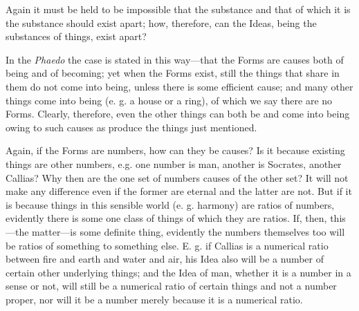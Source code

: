 Again it must be held to be impossible that the substance and that of which it is the substance should exist apart; how, therefore, can the Ideas, being the substances of things, exist apart?

In the \emph{Phaedo} the case is stated in this way—that the Forms are causes both of being and of becoming; yet when the Forms exist, still the things that share in them do not come into being, unless there is some efficient cause; and many other things come into being (e. g. a house or a ring), of which we say there are no Forms. Clearly, therefore, even the other things can both be and come into being owing to such causes as produce the things just mentioned.

Again, if the Forms are numbers, how can they be causes? Is it because existing things are other numbers, e.g. one number is man, another is Socrates, another Callias? Why then are the one set of numbers causes of the other set? It will not make any difference even if the former are eternal and the latter are not. But if it is because things in this sensible world (e. g. harmony) are ratios of numbers, evidently there is some one class of things of which they are ratios. If, then, this—the matter—is some definite thing, evidently the numbers themselves too will be ratios of something to something else. E. g. if Callias is a numerical ratio between fire and earth and water and air, his Idea also will be a number of certain other underlying things; and the Idea of man, whether it is a number in a sense or not, will still be a numerical ratio of certain things and not a number proper, nor will it be a number merely because it is a numerical ratio.

